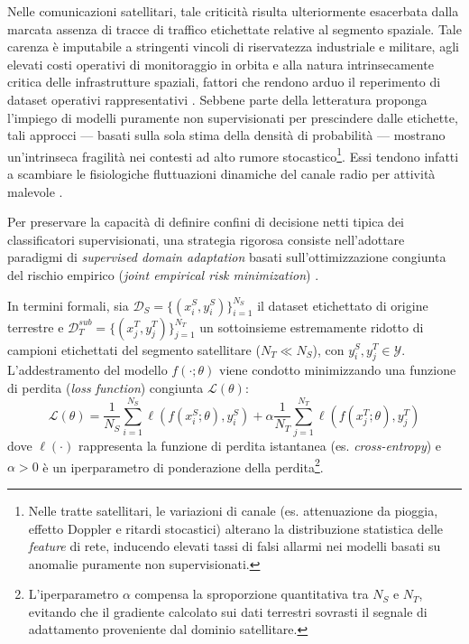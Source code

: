 Nelle comunicazioni satellitari, tale criticità risulta ulteriormente esacerbata dalla marcata assenza di tracce di traffico etichettate relative al segmento spaziale. 
Tale carenza è imputabile a stringenti vincoli di riservatezza industriale e militare, agli elevati costi operativi di monitoraggio in orbita e alla natura intrinsecamente critica delle infrastrutture spaziali, fattori che rendono arduo il reperimento di dataset operativi rappresentativi \cite{kodheli2021, azar2023}. 
Sebbene parte della letteratura proponga l'impiego di modelli puramente non supervisionati per prescindere dalle etichette, tali approcci — basati sulla sola stima della densità di probabilità — mostrano un'intrinseca fragilità nei contesti ad alto rumore stocastico\footnote{Nelle tratte satellitari, le variazioni di canale (es. attenuazione da pioggia, effetto Doppler e ritardi stocastici) alterano la distribuzione statistica delle \textit{feature} di rete, inducendo elevati tassi di falsi allarmi nei modelli basati su anomalie puramente non supervisionati.}. 
Essi tendono infatti a scambiare le fisiologiche fluttuazioni dinamiche del canale radio per attività malevole \cite{nist2022, khraisat2019}.

Per preservare la capacità di definire confini di decisione netti tipica dei classificatori supervisionati, una strategia rigorosa consiste nell'adottare paradigmi di \textit{supervised domain adaptation} basati sull'ottimizzazione congiunta del rischio empirico (\textit{joint empirical risk minimization}) \cite{daume2009, motiian2017}.

In termini formali, sia $\mathcal{D}_S = \{(x_i^S, y_i^S)\}_{i=1}^{N_S}$ il dataset etichettato di origine terrestre e $\mathcal{D}_T^{sub} = \{(x_j^T, y_j^T)\}_{j=1}^{N_T}$ un sottoinsieme estremamente ridotto di campioni etichettati del segmento satellitare ($N_T \ll N_S$), con $y_i^S, y_j^T \in \mathcal{Y}$. 
L'addestramento del modello $f(\cdot;\theta)$ viene condotto minimizzando una funzione di perdita (\textit{loss function}) congiunta $\mathcal{L}(\theta)$:
\begin{equation}
    \mathcal{L}(\theta) = \frac{1}{N_S} \sum_{i=1}^{N_S} \ell\left(f(x_i^S; \theta), y_i^S\right) + \alpha \frac{1}{N_T} \sum_{j=1}^{N_T} \ell\left(f(x_j^T; \theta), y_j^T\right)
    \label{eq:supervised_da_loss}
\end{equation}
dove $\ell(\cdot)$ rappresenta la funzione di perdita istantanea (es. \textit{cross-entropy}) e $\alpha > 0$ è un iperparametro di ponderazione della perdita\footnote{L'iperparametro $\alpha$ compensa la sproporzione quantitativa tra $N_S$ e $N_T$, evitando che il gradiente calcolato sui dati terrestri sovrasti il segnale di adattamento proveniente dal dominio satellitare.}.

